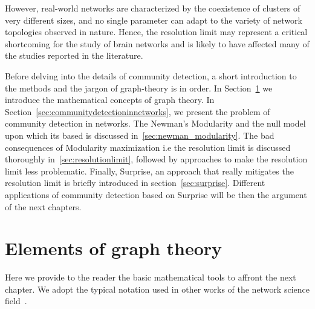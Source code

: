 However, real-world networks are characterized by the coexistence of clusters of very different sizes, and no single parameter can adapt to the variety of network topologies observed in nature.
Hence, the resolution limit may represent a critical shortcoming for the study of brain networks and is likely to have affected many of the studies reported in the literature.


Before delving into the details of community detection, a short introduction to the methods and the jargon of graph-theory is in order.
In Section~\ref{sec:elementsofgraphtheory} we introduce the mathematical concepts of graph theory. In Section~\ref{sec:communitydetectioninnetworks}, we present the problem of community detection in networks. The Newman's Modularity and the null model upon which its based is discussed in~\ref{sec:newman_modularity}. The bad consequences of Modularity maximization i.e the resolution limit is discussed thoroughly in~\ref{sec:resolutionlimit}, followed by approaches to make the resolution limit less problematic.
Finally, Surprise, an approach that really mitigates the resolution limit is briefly introduced in section~\ref{sec:surprise}. Different applications of community detection based on Surprise will be then the argument of the next chapters.

\section{Elements of graph theory}\label{sec:elementsofgraphtheory}
Here we provide to the reader the basic mathematical tools to affront the next chapter. We adopt the typical notation used in other works of the network science field~\cite{newman2010book,Estrada2011}.

